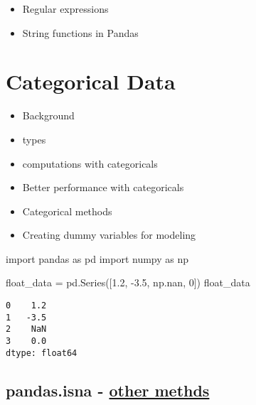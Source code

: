 \documentclass[
  letterpaper,
  DIV=11,
  numbers=noendperiod]{scrreprt}
\newenvironment{Shaded}{\begin{snugshade}}{\end{snugshade}}
\newcommand{\DecValTok}[1]{\textcolor[rgb]{0.68,0.00,0.00}{#1}}
\newcommand{\FloatTok}[1]{\textcolor[rgb]{0.68,0.00,0.00}{#1}}
\newcommand{\ImportTok}[1]{\textcolor[rgb]{0.00,0.46,0.62}{#1}}
\newcommand{\NormalTok}[1]{\textcolor[rgb]{0.00,0.23,0.31}{#1}}
\newcommand{\OperatorTok}[1]{\textcolor[rgb]{0.37,0.37,0.37}{#1}}
\providecommand{\tightlist}{%
  \setlength{\itemsep}{0pt}\setlength{\parskip}{0pt}}\usepackage{longtable,booktabs,array}
\begin{document}
\begin{itemize}
\tightlist
\item
  Regular expressions
\item
  String functions in Pandas
\end{itemize}

\hypertarget{categorical-data}{%
\section{Categorical Data}\label{categorical-data}}

\begin{itemize}
\tightlist
\item
  Background
\item
  types
\item
  computations with categoricals
\item
  Better performance with categoricals
\item
  Categorical methods
\item
  Creating dummy variables for modeling
\end{itemize}

\begin{Shaded}
\begin{Highlighting}[]
\ImportTok{import}\NormalTok{ pandas }\ImportTok{as}\NormalTok{ pd}
\ImportTok{import}\NormalTok{ numpy }\ImportTok{as}\NormalTok{ np}
\end{Highlighting}
\end{Shaded}

\begin{Shaded}
\begin{Highlighting}[]
\NormalTok{float\_data }\OperatorTok{=}\NormalTok{ pd.Series([}\FloatTok{1.2}\NormalTok{, }\OperatorTok{{-}}\FloatTok{3.5}\NormalTok{, np.nan, }\DecValTok{0}\NormalTok{])}
\NormalTok{float\_data}
\end{Highlighting}
\end{Shaded}

\begin{verbatim}
0    1.2
1   -3.5
2    NaN
3    0.0
dtype: float64
\end{verbatim}

\hypertarget{pandas.isna---other-methds}{%
\subsection{\texorpdfstring{pandas.isna -
\href{https://learning.oreilly.com/library/view/python-for-data/9781098104023/ch07.html\#table_na_method}{other
methds}}{pandas.isna - other methds}}\label{pandas.isna---other-methds}}
\end{document}
